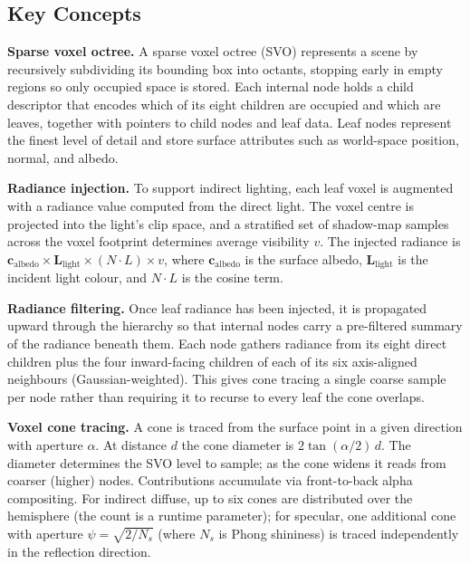 \documentclass[12pt]{article}
\begin{document}
\subsection{Key Concepts}

\textbf{Sparse voxel octree.} A sparse voxel octree (SVO) represents a scene by recursively subdividing its bounding box into octants, stopping early in empty regions so only occupied space is stored. Each internal node holds a child descriptor that encodes which of its eight children are occupied and which are leaves, together with pointers to child nodes and leaf data. Leaf nodes represent the finest level of detail and store surface attributes such as world-space position, normal, and albedo.

\textbf{Radiance injection.} To support indirect lighting, each leaf voxel is augmented with a radiance value computed from the direct light. The voxel centre is projected into the light's clip space, and a stratified set of shadow-map samples across the voxel footprint determines average visibility $v$. The injected radiance is $\mathbf{c}_\text{albedo} \times \mathbf{L}_\text{light} \times (N \cdot L) \times v$, where $\mathbf{c}_\text{albedo}$ is the surface albedo, $\mathbf{L}_\text{light}$ is the incident light colour, and $N \cdot L$ is the cosine term.

\textbf{Radiance filtering.} Once leaf radiance has been injected, it is propagated upward through the hierarchy so that internal nodes carry a pre-filtered summary of the radiance beneath them. Each node gathers radiance from its eight direct children plus the four inward-facing children of each of its six axis-aligned neighbours (Gaussian-weighted). This gives cone tracing a single coarse sample per node rather than requiring it to recurse to every leaf the cone overlaps.

\textbf{Voxel cone tracing.} A cone is traced from the surface point in a given direction with aperture $\alpha$. At distance $d$ the cone diameter is $2\tan(\alpha/2)\,d$. The diameter determines the SVO level to sample; as the cone widens it reads from coarser (higher) nodes. Contributions accumulate via front-to-back alpha compositing. For indirect diffuse, up to six cones are distributed over the hemisphere (the count is a runtime parameter); for specular, one additional cone with aperture $\psi = \sqrt{2/N_s}$ (where $N_s$ is Phong shininess) is traced independently in the reflection direction.

\end{document}
